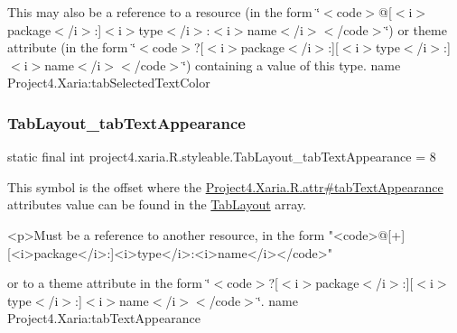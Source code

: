 This may also be a reference to a resource (in the form \char`\"{}$<$code$>$@\mbox{[}$<$i$>$package$<$/i$>$\+:\mbox{]}$<$i$>$type$<$/i$>$\+:$<$i$>$name$<$/i$>$$<$/code$>$\char`\"{}) or theme attribute (in the form \char`\"{}$<$code$>$?\mbox{[}$<$i$>$package$<$/i$>$\+:\mbox{]}\mbox{[}$<$i$>$type$<$/i$>$\+:\mbox{]}$<$i$>$name$<$/i$>$$<$/code$>$\char`\"{}) containing a value of this type.  name Project4.\+Xaria\+:tab\+Selected\+Text\+Color \mbox{\label{classproject4_1_1xaria_1_1R_1_1styleable_a053cc43fb27e9cdefa49d30126adbbc7}} 
\subsubsection{\texorpdfstring{Tab\+Layout\+\_\+tab\+Text\+Appearance}{TabLayout\_tabTextAppearance}}
{\footnotesize\ttfamily static final int project4.\+xaria.\+R.\+styleable.\+Tab\+Layout\+\_\+tab\+Text\+Appearance = 8\hspace{0.3cm}{\ttfamily [static]}}

This symbol is the offset where the \hyperlink{}{Project4.\+Xaria.\+R.\+attr\#tab\+Text\+Appearance} attribute\textquotesingle{}s value can be found in the \hyperlink{classproject4_1_1xaria_1_1R_1_1styleable_ab6bfb1f97ae9fba16f4f90d50871d4a8}{Tab\+Layout} array.

\begin{DoxyVerb}      <p>Must be a reference to another resource, in the form "<code>@[+][<i>package</i>:]<i>type</i>:<i>name</i></code>"
\end{DoxyVerb}
 or to a theme attribute in the form \char`\"{}$<$code$>$?\mbox{[}$<$i$>$package$<$/i$>$\+:\mbox{]}\mbox{[}$<$i$>$type$<$/i$>$\+:\mbox{]}$<$i$>$name$<$/i$>$$<$/code$>$\char`\"{}.  name Project4.\+Xaria\+:tab\+Text\+Appearance \mbox{\label{classproject4_1_1xaria_1_1R_1_1styleable_ae3d2d69da095e365fb2c36ae299f0100}} 
